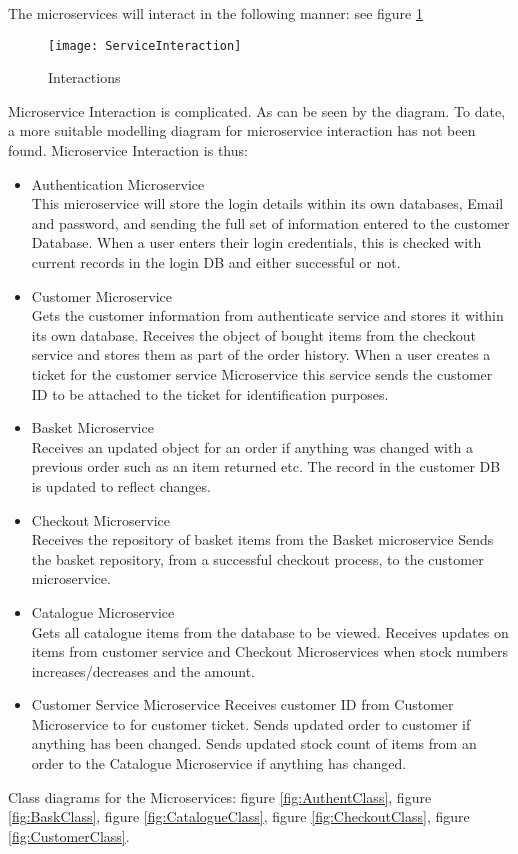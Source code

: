 \pagebreak
The microservices will interact in the following manner: see figure \ref{fig:MSAInteractions}\\
\begin{figure}[h]
	\caption{Interactions}
	\label{fig:MSAInteractions}
	\texttt{[image: ServiceInteraction]}
\end{figure}
Microservice Interaction is complicated. As can be seen by the diagram. To date, a more suitable modelling diagram for microservice interaction has not been found. Microservice Interaction is thus:
\begin{itemize}
	\item Authentication Microservice\\	
	This microservice will store the login details within its own databases, Email and password, and sending the full set of information entered to the customer Database.
	When a user enters their login credentials, this is checked with current records in the login DB and either successful or not.
	\item Customer Microservice\\
	Gets the customer information from authenticate service and stores it within its own database.
	Receives the object of bought items from the checkout service and stores them as part of the order history.
	When a user creates a ticket for the customer service Microservice this service sends the customer ID to be attached to the ticket for identification purposes.
	\item Basket Microservice\\
	Receives an updated object for an order if anything was changed with a previous order such as an item returned etc. The record in the customer DB is updated to reflect changes.
	\item Checkout Microservice\\
	Receives the repository of basket items from the Basket microservice
	Sends the basket repository, from a successful checkout process, to the customer microservice.
	\item Catalogue Microservice\\
	Gets all catalogue items from the database to be viewed. 
	Receives updates on items from customer service and Checkout Microservices when stock numbers increases/decreases and the amount.
	\item Customer Service Microservice
	Receives customer ID from Customer Microservice to for customer ticket.
	Sends updated order to customer if anything has been changed.
	Sends updated stock count of items from an order to the Catalogue Microservice if anything has changed.
\end{itemize}
\pagebreak
Class diagrams for the Microservices: figure \ref{fig:AuthentClass}, figure \ref{fig:BaskClass}, figure \ref{fig:CatalogueClass}, figure \ref{fig:CheckoutClass}, figure \ref{fig:CustomerClass}.